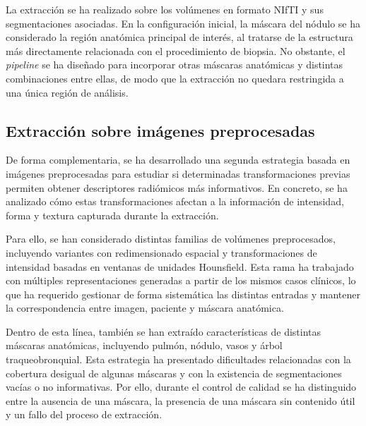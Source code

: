 La extracción se ha realizado sobre los volúmenes en formato NIfTI y sus segmentaciones asociadas. En la configuración inicial, la máscara del nódulo se ha considerado la región anatómica principal de interés, al tratarse de la estructura más directamente relacionada con el procedimiento de biopsia. No obstante, el \textit{pipeline} se ha diseñado para incorporar otras máscaras anatómicas y distintas combinaciones entre ellas, de modo que la extracción no quedara restringida a una única región de análisis.

\subsection{Extracción sobre imágenes preprocesadas}

De forma complementaria, se ha desarrollado una segunda estrategia basada en imágenes preprocesadas para estudiar si determinadas transformaciones previas permiten obtener descriptores radiómicos más informativos. En concreto, se ha analizado cómo estas transformaciones afectan a la información de intensidad, forma y textura capturada durante la extracción.

Para ello, se han considerado distintas familias de volúmenes preprocesados, incluyendo variantes con redimensionado espacial y transformaciones de intensidad basadas en ventanas de unidades Hounsfield. Esta rama ha trabajado con múltiples representaciones generadas a partir de los mismos casos clínicos, lo que ha requerido gestionar de forma sistemática las distintas entradas y mantener la correspondencia entre imagen, paciente y máscara anatómica.


Dentro de esta línea, también se han extraído características de distintas máscaras anatómicas, incluyendo pulmón, nódulo, vasos y árbol traqueobronquial. Esta estrategia ha presentado dificultades relacionadas con la cobertura desigual de algunas máscaras y con la existencia de segmentaciones vacías o no informativas. Por ello, durante el control de calidad se ha distinguido entre la ausencia de una máscara, la presencia de una máscara sin contenido útil y un fallo del proceso de extracción.

